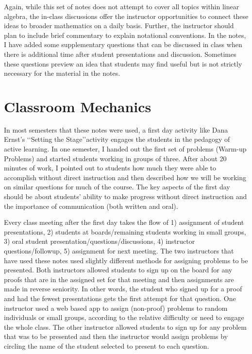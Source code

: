 \begin{annotation}
Again, while this set of notes does not attempt to cover all topics within linear algebra, the in-class discussions offer the instructor opportunities to connect these ideas to broader mathematics on a daily basis. Further, the instructor should plan to include brief commentary  to explain notational conventions. In the notes, I have added some supplementary  questions that can be discussed in class when there is additional time after student presentations and discussion. Sometimes these questions preview an idea that students may find useful but is not strictly necessary for the material in the notes.

\section{Classroom Mechanics}
In most semesters that these notes were used, a first day activity like Dana Ernst's \lq\lq{Setting the Stage}\rq\rq activity engages the students in the pedagogy of active learning. In one semester, I handed out the first set of problems (Warm-up Problems) and started students working  in groups of three. After about 20 minutes of work, I pointed out to students how much they were able to accomplish  without direct instruction and then described how we will be working on similar questions for much of the course. The key aspects of the first day should be about students' ability to make progress without direct instruction and the importance of communication (both written and oral).

Every class meeting after the first day  takes the flow of 1) assignment of student presentations, 2) students at boards/remaining students working in small groups, 3) oral student presentation/questions/discussions, 4) instructor questions/followup, 5) assignment for next meeting. The two instructors that have used these notes used slightly different methods for assigning problems to be presented. Both instructors allowed students to sign up on the board for any proofs that are in the assigned set for that meeting and then assignments are made in reverse seniority. In other words, the student who signed up for a proof and had the fewest presentations gets the first attempt for that question. One instructor used a web based app to assign (non-proof) problems to random individuals or small groups, according to the relative difficulty or need to engage the whole class. The other instructor allowed students to sign up for any problem that was to be presented and then the instructor would assign problems by circling the name of the student selected to present to each question.


\end{annotation}
